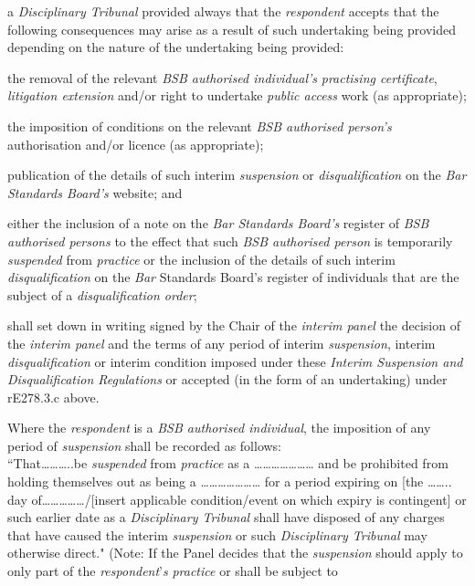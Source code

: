 a \emph{Disciplinary Tribunal} provided always that
the \emph{respondent }accepts that the following consequences may arise
as a result of such undertaking being provided depending on the nature
of the undertaking being provided:\item the removal of the relevant \emph{BSB authorised
individual's} \emph{practising certificate}, \emph{litigation
extension} and/or right to undertake \emph{public access} work (as
appropriate);\item the imposition of conditions on the relevant \emph{BSB authorised
person's} authorisation\textbf{ }and/or licence (as appropriate);\item publication of the details of such
interim \emph{suspension} or \emph{disqualification} on the \emph{Bar
Standards Board's} website; and\item either the inclusion of a note on the \emph{Bar Standards
Board's} register of \emph{BSB authorised persons} to the effect that
such \emph{BSB authorised person} is
temporarily \emph{suspended} from \emph{practice} or the inclusion of
the details of such interim \emph{disqualification} on
the \emph{Bar }Standards Board's register of individuals that are the
subject of a \emph{disqualification order};\item shall set down in writing signed by the Chair of the \emph{interim
panel} the decision of the \emph{interim panel} and the terms of any
period of interim \emph{suspension}, interim \emph{disqualification} or
interim condition imposed under these \emph{Interim Suspension and
Disqualification Regulations} or accepted (in the form of an
undertaking) under rE278.3.c above.\al
\item  Where the \emph{respondent} is a \emph{BSB authorised individual},
the imposition of any period of \emph{suspension} shall be recorded as
follows:\\
``That\ldots\ldots\ldots..be \emph{suspended} from \emph{practice} as a
\ldots\ldots\ldots\ldots\ldots\ldots\ldots{} and be prohibited from
holding themselves out as being a
\ldots\ldots\ldots\ldots\ldots\ldots\ldots{} for a period expiring on
{[}the \ldots\ldots.. day of\ldots\ldots\ldots\ldots\ldots/{[}insert
applicable condition/event on which expiry is contingent{]} or such
earlier date as a \emph{Disciplinary Tribunal} shall have disposed of
any charges that have caused the interim \emph{suspension} or
such \emph{Disciplinary Tribunal} may otherwise direct." (Note: If the
Panel decides that the \emph{suspension} should apply to only part of
the \emph{respondent}'\emph{s} \emph{practice} or shall be subject to
